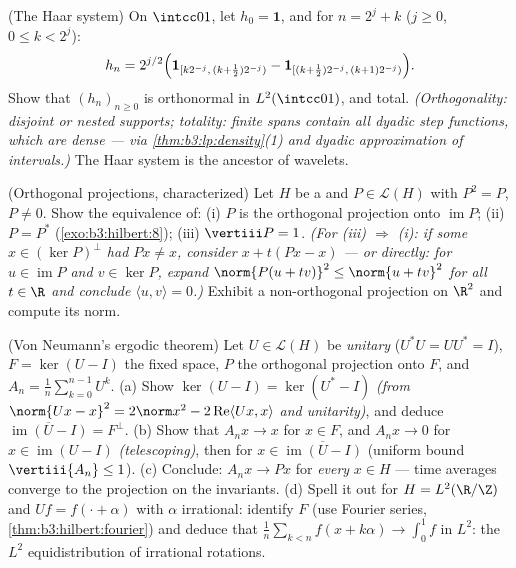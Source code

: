 \begin{exercise}[$\star\star\star$]\label{exo:b3:hilbert:10}
(The Haar system) On $\intcc01$, let $h_{0} = \mathbf 1$, and
for $n = 2^j + k$ ($j \geq 0$, $0 \leq k < 2^j$):
\[
h_n = 2^{j/2}\Bigl(\mathbf 1_{[k2^{-j},\,(k +
\frac12)2^{-j})} - \mathbf 1_{[(k+\frac12)2^{-j},\,(k+1)2^{-j})}
\Bigr).
\]
Show that $(h_n)_{n\geq0}$ is orthonormal in $L^2(\intcc01)$,
and total. \emph{(Orthogonality: disjoint or nested supports;
totality: finite spans contain all dyadic step functions,
which are dense --- via \cref{thm:b3:lp:density}(1) and dyadic
approximation of intervals.)} The Haar system is the ancestor
of wavelets.
\end{exercise}

\begin{exercise}[$\star\star$]\label{exo:b3:hilbert:11}
(Orthogonal projections, characterized) Let $H$ be a  and $P \in \mathcal L(H)$ with $P^2 = P$, $P \neq 0$.
Show the equivalence of:
(i) $P$ is the orthogonal projection onto
$\operatorname{im}P$;
(ii) $P = P^*$ (\cref{exo:b3:hilbert:8});
(iii) $\vertiii P = 1$.
\emph{(For (iii) $\Rightarrow$ (i): if some $x \in
(\ker P)^\perp$ had $Px \neq x$, consider $x + t(Px - x)$
--- or directly: for $u \in \operatorname{im}P$ and $v \in
\ker P$, expand $\norm{P(u + tv)}^2 \leq \norm{u + tv}^2$
for all $t \in \R$ and conclude $\langle u, v\rangle = 0$.)}
Exhibit a non-orthogonal projection on $\R^2$ and compute
its norm.
\end{exercise}

\begin{exercise}[$\star\star\star$]\label{exo:b3:hilbert:12}
(Von Neumann's ergodic theorem) Let $U \in \mathcal L(H)$ be
\emph{unitary} ($U^*U = UU^* = I$), $F = \ker(U - I)$ the
fixed space, $P$ the orthogonal projection onto $F$, and
$A_n = \frac1n\sum_{k=0}^{n-1}U^k$.
(a) Show $\ker(U - I) = \ker(U^* - I)$ \emph{(from
$\norm{Ux - x}^2 = 2\norm x^2 - 2\operatorname{Re}\langle
Ux, x\rangle$ and unitarity)}, and deduce
$\overline{\operatorname{im}(U - I)} = F^\perp$.
(b) Show that $A_nx \to x$ for $x \in F$, and $A_nx \to 0$
for $x \in \operatorname{im}(U - I)$ \emph{(telescoping)},
then for $x \in \overline{\operatorname{im}(U - I)}$
(uniform bound $\vertiii{A_n} \leq 1$).
(c) Conclude: $A_nx \to Px$ for \emph{every} $x \in H$ ---
time averages converge to the projection on the invariants.
(d) Spell it out for $H = L^2(\R/\Z)$ and $Uf = f(\cdot +
\alpha)$ with $\alpha$ irrational: identify $F$ (use
Fourier series, \cref{thm:b3:hilbert:fourier}) and deduce
that $\frac1n\sum_{k<n}f(x + k\alpha) \to \int_0^1f$ in
$L^2$: the $L^2$ equidistribution of irrational rotations.
\end{exercise}

